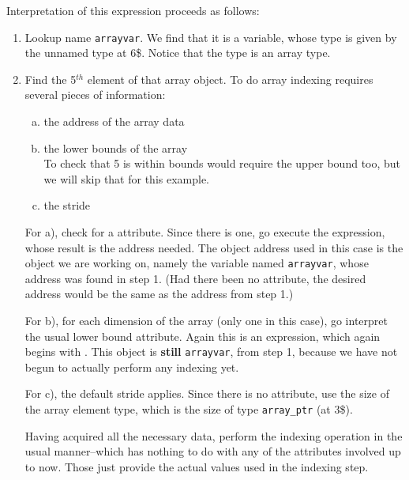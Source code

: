 Interpretation of this expression proceeds as follows:
\begin{enumerate}[1. ]

\item Lookup name \texttt{arrayvar}. We find that it is a variable,
whose type is given by the unnamed type at 6\$. Notice that
the type is an array type.


\item Find the 5$^{th}$ element of that array object. To do array
indexing requires several pieces of information:
\begin{enumerate}[a) ]

\item  the address of the array data

\item the lower bounds of the array \\
\lbrack To check that 5 is within bounds would require the upper
bound too, but we will skip that for this example. \rbrack

\item the stride 

\end{enumerate}

For a), check for a 
 attribute. 
Since there is one, go execute the expression, whose result is
the address needed. The object address used in this case
is the object we are working on, namely the variable named
\texttt{arrayvar}, whose address was found in step 1. (Had there been
no  attribute, the desired address would
be the same as the address from step 1.)

For b), for each dimension of the array (only one
in this case), go interpret the usual lower bound
attribute. Again this is an expression, which again begins
with . This object is 
\textbf{still} \texttt{arrayvar},
from step 1, because we have not begun to actually perform
any indexing yet.

For c), the default stride applies. Since there is no
 attribute, use the size of the array element
type, which is the size of type \texttt{array\_ptr} (at 3\$).

\clearpage

Having acquired all the necessary data, perform the indexing
operation in the usual manner--which has nothing to do with
any of the attributes involved up to now. Those just provide
the actual values used in the indexing step.


\end{enumerate}
